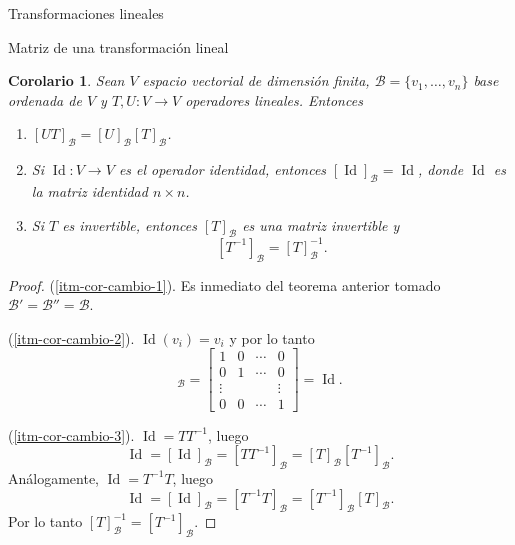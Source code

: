\documentclass[a4paper,12pt,twoside,spanish,reqno]{amsbook}
\newtheorem{corolario}[teorema]{Corolario}
\theoremstyle{definition}
\theoremstyle{remark}
\newcommand{\Id}{\operatorname{Id}}
\begin{document}
\begin{chapter}{Transformaciones lineales}
\begin{section}{Matriz de una transformación lineal}
		\begin{corolario}\label{cor-5.6} Sean $V$ espacio vectorial de dimensión finita, $\mathcal B = \{v_1,\ldots,v_n\}$ base ordenada de $V$ y $T,U: V \to V$ operadores lineales. Entonces
			\begin{enumerate}
				\item\label{itm-cor-cambio-1} $[UT]_{\mathcal B} = [U]_{\mathcal B} [T]_{\mathcal B}$.
				\item\label{itm-cor-cambio-2} Si $\Id: V \to V$  es el operador identidad, entonces $[\Id]_{\mathcal B} =\Id$,  donde $\Id$  es la matriz identidad $n \times n$.
				\item\label{itm-cor-cambio-3} Si $T$  es invertible,  entonces $[T]_{\mathcal B}$  es una matriz invertible y  $$[T^{-1}]_{\mathcal B} = [T]_{\mathcal B}^{-1}.$$
			\end{enumerate}
		\end{corolario}
		\begin{proof}
			(\ref{itm-cor-cambio-1}). Es inmediato del teorema anterior tomado $\mathcal B' =\mathcal B'' = \mathcal B$. 
			
			(\ref{itm-cor-cambio-2}). $\Id(v_i) = v_i$ y por lo tanto
			\begin{equation*}
				[\Id]_{\mathcal B} = \begin{bmatrix} 1&0&\cdots&0 \\0&1&\cdots&0\\\vdots&&&\vdots\\0&0&\cdots&1 	\end{bmatrix} = \Id.
			\end{equation*}
			
			
			(\ref{itm-cor-cambio-3}). $\Id = T T^{-1}$, luego
			\begin{equation*}
				\Id = [\Id]_{\mathcal B} =  [T T^{-1}]_{\mathcal B} =  [T]_{\mathcal B} [T^{-1}]_{\mathcal B}.
			\end{equation*}
			 Análogamente, $\Id = T^{-1} T$, luego
			\begin{equation*}
			\Id = [\Id]_{\mathcal B} =  [T^{-1} T]_{\mathcal B} =  [T^{-1}]_{\mathcal B} [T]_{\mathcal B}. 
			\end{equation*}
			Por  lo tanto $[T]_{\mathcal B}^{-1} = [T^{-1}]_{\mathcal B}$.
		\end{proof}	
	
	
			

\end{section}
\end{chapter}
\end{document}
